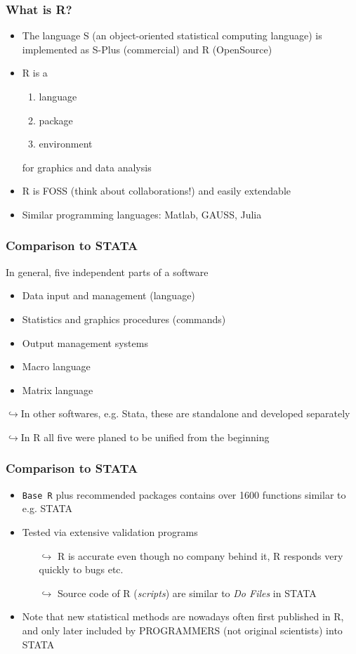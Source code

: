 \documentclass[xcolor={svgnames},10pt,
handout
]{beamer}
\begin{document}
\begin{frame}
\frametitle{What is R?}
\begin{itemize}
\item The language S (an object-oriented statistical computing language) is implemented as S-Plus (commercial) and R (OpenSource)
\item R is a
\begin{enumerate}
	\item language
	\item package
	\item environment
\end{enumerate}
for graphics and data analysis
\item R is FOSS (think about collaborations!) and easily extendable
\item Similar programming languages: Matlab, GAUSS, Julia
\end{itemize}
\end{frame}

\begin{frame}\frametitle{Comparison to STATA}
In general, five independent parts of a software
\begin{itemize}
\item Data input and management (language)
\item Statistics and graphics procedures (commands)
\item Output management systems
\item Macro language
\item Matrix language
\end{itemize}
$\hookrightarrow$In other softwares, e.g. Stata, these are standalone and developed separately

$\hookrightarrow$In R all five were planed to be unified from the beginning
\end{frame}

\begin{frame}\frametitle{Comparison to STATA}
\begin{itemize}
\item \texttt{Base R} plus recommended packages contains over 1600 functions similar to e.g. STATA
\item Tested via extensive validation programs
\begin{itemize}
\item[$\hookrightarrow$] R is accurate even though no company behind it, R responds very quickly to bugs etc.
\item[$\hookrightarrow$] Source code of R (\textit{scripts}) are similar to \textit{Do Files} in STATA
\end{itemize}
\item Note that new statistical methods are nowadays often first published in R, and only later included by PROGRAMMERS (not original scientists) into STATA
\end{itemize}
\end{frame}
\end{document}
